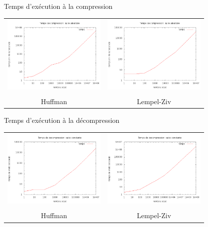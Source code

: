 \documentclass[french]{beamer}
\begin{document}
\begin{frame}{Temps d'exécution à la compression} 
	\begin{center}
	\begin{tabular}{c | c}
	\includegraphics[width=5cm]{tempsChA.png} & 
	\includegraphics[width=5cm]{tempsClzA.png}
	\\  &  \\ 
	Huffman & Lempel-Ziv
	\end{tabular}	
	\end{center}
\end{frame}

\begin{frame}{Temps d'exécution à la décompression}
	\begin{center}
	\begin{tabular}{c | c}
	\includegraphics[width=5cm]{tempsDhC.png} & 
	\includegraphics[width=5cm]{tempsDlzC.png}
	\\  &  \\ 
	Huffman & Lempel-Ziv
	\end{tabular}
	\end{center}
\end{frame}
\end{document}
